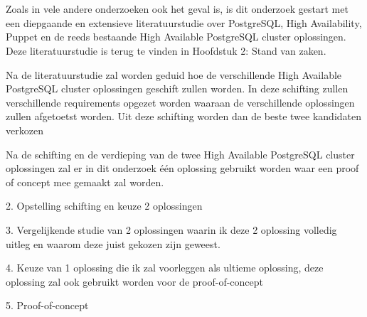 
\chapter{}
\label{ch:methodologie}


Zoals in vele andere onderzoeken ook het geval is, is dit onderzoek gestart met een diepgaande en extensieve literatuurstudie over PostgreSQL, High Availability, Puppet en de reeds bestaande High Available PostgreSQL cluster oplossingen. Deze literatuurstudie is terug te vinden in Hoofdstuk 2: Stand van zaken.

Na de literatuurstudie zal worden geduid hoe de verschillende High Available PostgreSQL cluster oplossingen geschift zullen worden. In deze schifting zullen verschillende requirements opgezet worden waaraan de verschillende oplossingen zullen afgetoetst worden.
Uit deze schifting worden dan de beste twee kandidaten verkozen %

Na de schifting en de verdieping van de twee High Available PostgreSQL cluster oplossingen zal er in dit onderzoek één oplossing gebruikt worden waar een proof of concept mee gemaakt zal worden.

2. Opstelling schifting en keuze 2 oplossingen


3. Vergelijkende studie van 2 oplossingen waarin ik deze 2 oplossing volledig uitleg en waarom deze juist gekozen zijn geweest.


4. Keuze van 1 oplossing die ik zal voorleggen als ultieme oplossing, deze oplossing zal ook gebruikt worden voor de proof-of-concept

5. Proof-of-concept


